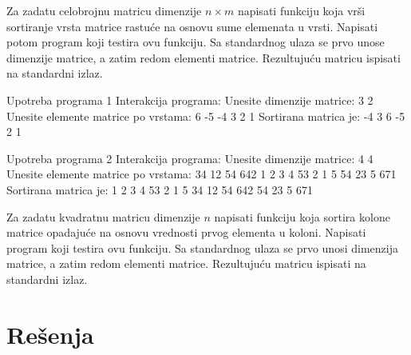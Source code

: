 \begin{Exercise}[label=526]
  Za zadatu celobrojnu matricu dimenzije $n \times m$ napisati
  funkciju koja vrši sortiranje vrsta matrice rastuće na osnovu sume
  elemenata u vrsti. Napisati potom program koji testira ovu funkciju. Sa
  standardnog ulaza se prvo unose dimenzije matrice, a zatim redom
  elementi matrice. Rezultujuću matricu ispisati na standardni izlaz.

\begin{miditest}
\begin{test}{Upotreba programa 1}
Interakcija programa:    
  Unesite dimenzije matrice: 3 2
  Unesite elemente matrice po vrstama:
  6 -5
  -4 3
  2 1
  Sortirana matrica je:
  -4 3 
  6 -5 
  2 1   
\end{test}
\end{miditest}
\begin{miditest}
\begin{test}{Upotreba programa 2}
Interakcija programa:    
  Unesite dimenzije matrice: 4 4
  Unesite elemente matrice po vrstama:
  34 12 54 642
  1 2 3 4
  53 2 1 5
  54 23 5 671
  Sortirana matrica je:
  1 2 3 4 
  53 2 1 5 
  34 12 54 642 
  54 23 5 671 
\end{test}
\end{miditest}

\end{Exercise}

\begin{Answer}[ref=526]
\end{Answer}
\begin{Exercise}[label=527]
  Za zadatu kvadratnu matricu dimenzije $n$ napisati funkciju koja
  sortira kolone matrice opadajuće na osnovu vrednosti prvog
  elementa u koloni.  Napisati program koji testira ovu funkciju. Sa
  standardnog ulaza se prvo unosi dimenzija matrice, a zatim redom
  elementi matrice.  Rezultujuću matricu ispisati na standardni izlaz.
  
\end{Exercise}


\section{Rešenja}
\shipoutAnswer


